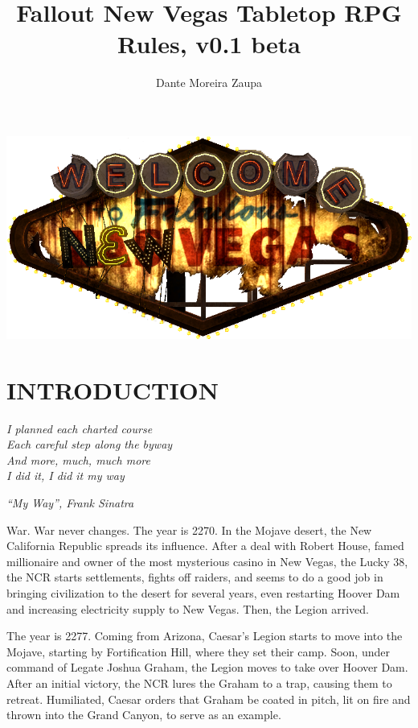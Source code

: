 \documentclass[11pt]{article} %
\title{Fallout New Vegas Tabletop RPG Rules, v0.1 beta}
\author{Dante Moreira Zaupa}
\begin{document}
\maketitle
\begin{center}
\includegraphics[scale=0.5]{logo_new_vegas.png}
\end{center}
\newpage
\tableofcontents
\newpage
\listoftables
\newpage


\section{INTRODUCTION}

\epigraph{\textit{I planned each charted course \\
Each careful step along the byway \\
And more, much, much more \\
I did it, I did it my way}}{\textit{``My Way'', Frank Sinatra}}

War. War never changes. The year is 2270. In the Mojave desert, the New California Republic spreads its influence. After a deal with Robert House, famed millionaire and owner of the most mysterious casino in New Vegas, the Lucky 38, the NCR starts settlements, fights off raiders, and seems to do a good job in bringing civilization to the desert for several years, even restarting Hoover Dam and increasing electricity supply to New Vegas. Then, the Legion arrived.

The year is 2277. Coming from Arizona, Caesar's Legion starts to move into the Mojave, starting by Fortification Hill, where they set their camp. Soon, under command of Legate Joshua Graham, the Legion moves to take over Hoover Dam. After an initial victory, the NCR lures the Graham to a trap, causing them to retreat. Humiliated, Caesar orders that Graham be coated in pitch, lit on fire and thrown into the Grand Canyon, to serve as an example. 
\end{document}
